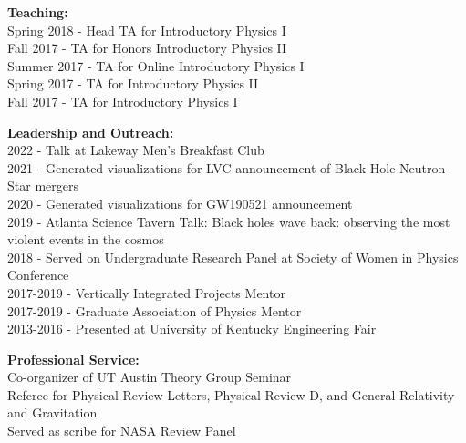\documentclass[11pt]{article}
\begin{document}
\begin{flushleft}
  \textbf{Teaching:}\\
  Spring 2018 - Head TA for Introductory Physics I\\
  Fall 2017 - TA for Honors Introductory Physics II\\
  Summer 2017 - TA for Online Introductory Physics I\\
  Spring 2017 - TA for Introductory Physics II\\
  Fall 2017 - TA for Introductory Physics I\\
 
  \vspace{8px}   
 
  \textbf{Leadership and Outreach:}\\
  2022 - Talk at Lakeway Men's Breakfast Club\\
  2021 - Generated visualizations for LVC announcement of Black-Hole Neutron-Star mergers\\
  2020 - Generated visualizations for GW190521 announcement\\
  2019 - Atlanta Science Tavern Talk: Black holes wave back: observing the most violent events in the cosmos\\
  2018 - Served on Undergraduate Research Panel at Society of Women in Physics Conference\\
  2017-2019 - Vertically Integrated Projects Mentor\\
  2017-2019 - Graduate Association of Physics Mentor\\
  2013-2016 - Presented at University of Kentucky Engineering Fair\\

  \vspace{8px}

  \textbf{Professional Service: }\\
  Co-organizer of UT Austin Theory Group Seminar\\
  Referee for Physical Review Letters, Physical Review D,  and General Relativity and Gravitation\\
  Served as scribe for NASA Review Panel\\
  
\end{flushleft}
\end{document}
